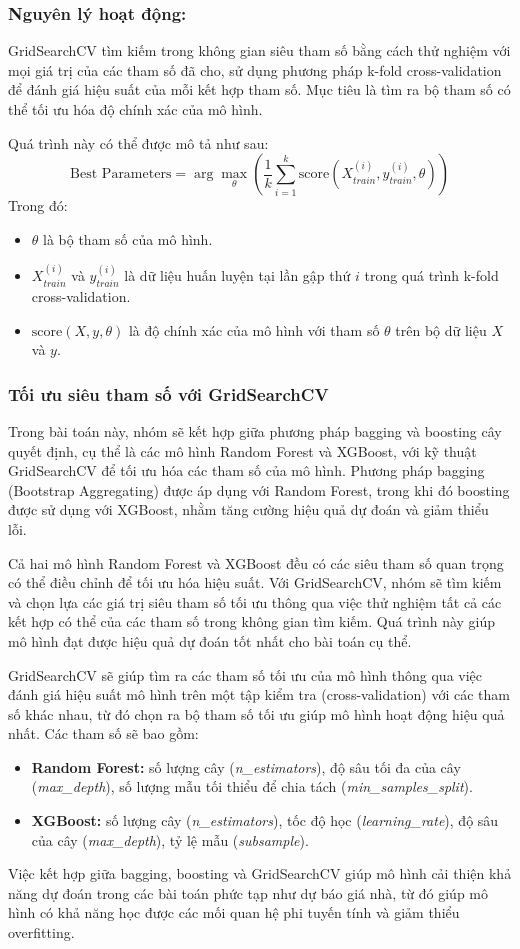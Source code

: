 \subsubsection*{Nguyên lý hoạt động:}
GridSearchCV tìm kiếm trong không gian siêu tham số bằng cách thử nghiệm với mọi giá trị của các tham số đã cho, sử dụng phương pháp k-fold cross-validation để đánh giá hiệu suất của mỗi kết hợp tham số. Mục tiêu là tìm ra bộ tham số có thể tối ưu hóa độ chính xác của mô hình.

Quá trình này có thể được mô tả như sau:
\[
\text{Best Parameters} = \arg \max_{\theta} \left( \frac{1}{k} \sum_{i=1}^{k} \text{score}(X_{train}^{(i)}, y_{train}^{(i)}, \theta) \right)
\]
Trong đó:
\begin{itemize}
    \item \( \theta \) là bộ tham số của mô hình.
    \item \( X_{train}^{(i)} \) và \( y_{train}^{(i)} \) là dữ liệu huấn luyện tại lần gập thứ \(i\) trong quá trình k-fold cross-validation.
    \item \(\text{score}(X, y, \theta)\) là độ chính xác của mô hình với tham số \(\theta\) trên bộ dữ liệu \(X\) và \(y\).
\end{itemize}
\subsubsection*{Tối ưu siêu tham số với GridSearchCV}
Trong bài toán này, nhóm sẽ kết hợp giữa phương pháp bagging và boosting cây quyết định, cụ thể là các mô hình Random Forest và XGBoost, với kỹ thuật GridSearchCV để tối ưu hóa các tham số của mô hình. Phương pháp bagging (Bootstrap Aggregating) được áp dụng với Random Forest, trong khi đó boosting được sử dụng với XGBoost, nhằm tăng cường hiệu quả dự đoán và giảm thiểu lỗi.

Cả hai mô hình Random Forest và XGBoost đều có các siêu tham số quan trọng có thể điều chỉnh để tối ưu hóa hiệu suất. Với GridSearchCV, nhóm sẽ tìm kiếm và chọn lựa các giá trị siêu tham số tối ưu thông qua việc thử nghiệm tất cả các kết hợp có thể của các tham số trong không gian tìm kiếm. Quá trình này giúp mô hình đạt được hiệu quả dự đoán tốt nhất cho bài toán cụ thể.

GridSearchCV sẽ giúp tìm ra các tham số tối ưu của mô hình thông qua việc đánh giá hiệu suất mô hình trên một tập kiểm tra (cross-validation) với các tham số khác nhau, từ đó chọn ra bộ tham số tối ưu giúp mô hình hoạt động hiệu quả nhất. Các tham số sẽ bao gồm:
\begin{itemize}
    \item \textbf{Random Forest:} số lượng cây (\textit{n\_estimators}), độ sâu tối đa của cây (\textit{max\_depth}), số lượng mẫu tối thiểu để chia tách (\textit{min\_samples\_split}).
    \item \textbf{XGBoost:} số lượng cây (\textit{n\_estimators}), tốc độ học (\textit{learning\_rate}), độ sâu của cây (\textit{max\_depth}), tỷ lệ mẫu (\textit{subsample}).
\end{itemize}

Việc kết hợp giữa bagging, boosting và GridSearchCV giúp mô hình cải thiện khả năng dự đoán trong các bài toán phức tạp như dự báo giá nhà, từ đó giúp mô hình có khả năng học được các mối quan hệ phi tuyến tính và giảm thiểu overfitting.

